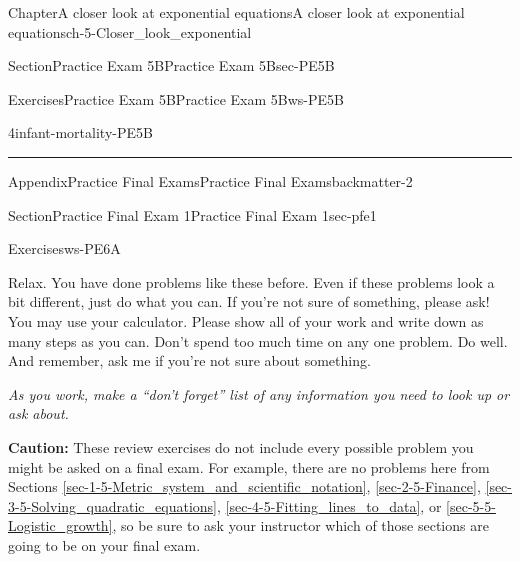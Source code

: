 \documentclass[twoside,11pt,]{book}
\newcommand{\xreffont}{\relax}
\newcommand{\terminology}[1]{\textbf{#1}}
\newlength{\workspacestrutwidth}
\numberwithin{equation}{section}
\providecommand\phantomsection{}
\begin{document}
\begin{chapterptx}{Chapter}{A closer look at exponential equations}{}{A closer look at exponential equations}{}{}{ch-5-Closer_look_exponential}
\begin{sectionptx}{Section}{Practice Exam 5B}{}{Practice Exam 5B}{}{}{sec-PE5B}
\begin{exercises-subsection-numberless}{Exercises}{Practice Exam 5B}{}{Practice Exam 5B}{}{}{ws-PE5B}
\begin{divisionexercise}{4}{}{}{infant-mortality-PE5B}
\begin{enumerate}[label=(\alph*),ref=\alph*]
\par\rule{\workspacestrutwidth}{0in}%
\end{enumerate}%
\end{divisionexercise}%
\end{exercises-subsection-numberless}
\end{sectionptx}
\end{chapterptx}
%
\appendix%
%
\clearpage\phantomsection%
%
%
%
\typeout{************************************************}
\typeout{************************************************}
%
\begin{appendixptx}{Appendix}{Practice Final Exams}{}{Practice Final Exams}{}{}{backmatter-2}
\renewcommand*{\appendixname}{Appendix}
%
%
\typeout{************************************************}
\typeout{************************************************}
%
\begin{sectionptx}{Section}{Practice Final Exam 1}{}{Practice Final Exam 1}{}{}{sec-pfe1}
%
%
\typeout{************************************************}
\typeout{************************************************}
%
\begin{exercises-subsection-numberless}{Exercises}{}{}{}{}{}{ws-PE6A}
\begin{introduction}{}%
Relax. You have done problems like these before. Even if these problems look a bit different, just do what you can. If you're not sure of something, please ask! You may use your calculator. Please show all of your work and write down as many steps as you can. Don't spend too much time on any one problem. Do well. And remember, ask me if you're not sure about something.%
\par
\emph{As you work, make a ``don't forget'' list of any information you need to look up or ask about.}%
\par
\terminology{Caution:} These review exercises do not include every possible problem you might be asked on a final exam. For example, there are no problems here from Sections \hyperref[sec-1-5-Metric_system_and_scientific_notation]{{\xreffont\ref{sec-1-5-Metric_system_and_scientific_notation}}}, \hyperref[sec-2-5-Finance]{{\xreffont\ref{sec-2-5-Finance}}}, \hyperref[sec-3-5-Solving_quadratic_equations]{{\xreffont\ref{sec-3-5-Solving_quadratic_equations}}}, \hyperref[sec-4-5-Fitting_lines_to_data]{{\xreffont\ref{sec-4-5-Fitting_lines_to_data}}}, or \hyperref[sec-5-5-Logistic_growth]{{\xreffont\ref{sec-5-5-Logistic_growth}}}, so be sure to ask your instructor which of those sections are going to be on your final exam.%

\end{introduction}
\end{exercises-subsection-numberless}
\end{sectionptx}
\end{appendixptx}
\end{document}

